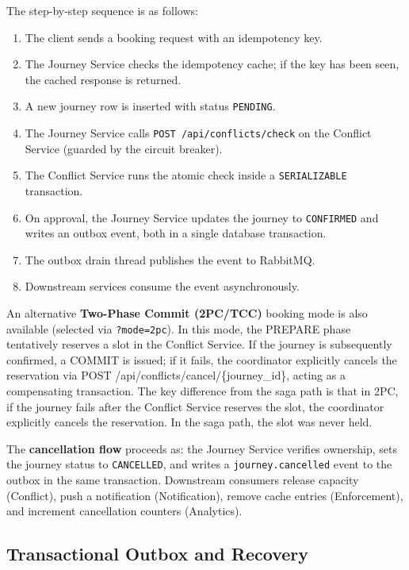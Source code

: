\documentclass[12pt,a4paper]{article}
\begin{document}
The step-by-step sequence is as follows:
\begin{enumerate}
    \item The client sends a booking request with an idempotency key.
    \item The Journey Service checks the idempotency cache; if the key has been seen, the cached response is returned.
    \item A new journey row is inserted with status \texttt{PENDING}.
    \item The Journey Service calls \texttt{POST /api/conflicts/check} on the Conflict Service (guarded by the circuit breaker).
    \item The Conflict Service runs the atomic check inside a \texttt{SERIALIZABLE} transaction.
    \item On approval, the Journey Service updates the journey to \texttt{CONFIRMED} and writes an outbox event, both in a single database transaction.
    \item The outbox drain thread publishes the event to RabbitMQ.
    \item Downstream services consume the event asynchronously.
\end{enumerate}
 
An alternative \textbf{Two-Phase Commit (2PC/TCC)} booking mode is also available (selected via \texttt{?mode=2pc}). In this mode, the PREPARE phase tentatively reserves a slot in the Conflict Service. If the journey is subsequently confirmed, a COMMIT is issued; if it fails, the coordinator explicitly cancels the reservation via POST /api/conflicts/cancel/\{journey\_id\}, acting as a compensating transaction. The key difference from the saga path is that in 2PC, if the journey fails after the Conflict Service reserves the slot, the coordinator explicitly cancels the reservation. In the saga path, the slot was never held.
 
The \textbf{cancellation flow} proceeds as: the Journey Service verifies ownership, sets the journey status to \texttt{CANCELLED}, and writes a \texttt{journey.cancelled} event to the outbox in the same transaction. Downstream consumers release capacity (Conflict), push a notification (Notification), remove cache entries (Enforcement), and increment cancellation counters (Analytics).

\subsection{Transactional Outbox and Recovery}
\end{document}

